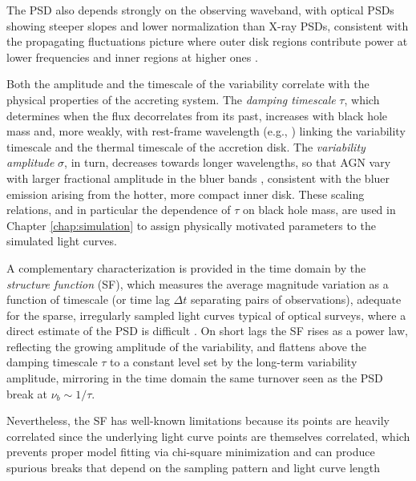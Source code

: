 The PSD also depends strongly on the observing waveband, with optical PSDs showing steeper slopes and lower normalization than X-ray PSDs, consistent with the propagating fluctuations picture where outer disk regions contribute power at lower frequencies and inner regions at higher ones \parencite{Kara2025SMBHXRayReview}.

Both the amplitude and the timescale of the variability correlate with the physical properties of the accreting system. The \textit{damping timescale} $\tau$, which determines when the flux decorrelates from its past, increases with black hole mass and, more weakly, with rest-frame wavelength (e.g., \cites{Collier2001Timescales}{Burke2021TimescaleBHMass}) linking the variability timescale and the thermal timescale of the accretion disk. The \textit{variability amplitude} $\sigma$, in turn, decreases towards longer wavelengths, so that AGN vary with larger fractional amplitude in the bluer bands \parencite{MacLeod2010ScalRel}, consistent with the bluer emission arising from the hotter, more compact inner disk. These scaling relations, and in particular the dependence of $\tau$ on black hole mass, are used in Chapter \ref{chap:simulation} to assign physically motivated parameters to the simulated light curves.

A complementary characterization is provided in the time domain by the \textit{structure function} (SF), which measures the average magnitude variation as a function of timescale (or time lag $\Delta t$ separating pairs of observations), adequate for the sparse, irregularly sampled light curves typical of optical surveys, where a direct estimate of the PSD is difficult \parencite{Kozlowski2016SF}. On short lags the SF rises as a power law, reflecting the growing amplitude of the variability, and flattens above the damping timescale $\tau$ to a constant level set by the long-term variability amplitude, mirroring in the time domain the same turnover seen as the PSD break at $\nu_b \sim 1/\tau$.

Nevertheless, the SF has well-known limitations because its points are heavily correlated since the underlying light curve points are themselves correlated, which prevents proper model fitting via chi-square minimization and can produce spurious breaks that depend on the sampling pattern and light curve length \parencite{Emmanoulopoulos2010SFonBlazar}


